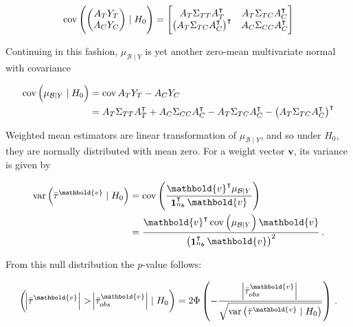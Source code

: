 \documentclass[letter]{article}
\let\Pr\relax
\DeclareMathOperator{\Pr}{\mathbb{P}}
\DeclareMathOperator{\cov}{{cov}}
\DeclareMathOperator{\var}{{var}}
\DeclareMathOperator{\ones}{\mathbf{1}}
\newcommand{\trans}{^{\intercal}}
\newcommand{\vvec}{\mathbold{v}}
\newcommand{\boundary}{\mathcal{B}}
\newcommand{\sentinels}{\bm{b}}
\begin{document}
\begin{equation}
    \cov \del{\begin{pmatrix}A_T Y_T \\ A_C Y_C \end{pmatrix} \mid H_0 } = \begin{bmatrix}
                        A_T \Sigma_{TT} A_T\trans & A_T \Sigma_{TC} A_C\trans \\
                        \del{A_T \Sigma_{TC} A_C \trans}\trans & A_C \Sigma_{CC} A_C\trans
                    \end{bmatrix}
\end{equation}

Continuing in this fashion, \(\mu_{\boundary \mid Y}\) is yet another zero-mean multivariate normal with covariance
    


    	\begin{equation}
\begin{split}
    \cov \del{\mu_{\boundary \mid Y} \mid H_0} &= \cov{ A_T Y_T - A_C Y_C } \\
        &= A_T \Sigma_{TT} A_T\trans + A_C \Sigma_{CC} A_C\trans - A_T \Sigma_{TC} A_C\trans -  \del{A_T\Sigma_{TC} A_C\trans}\trans
\end{split}
\end{equation}
    


    	Weighted mean estimators are linear transformation of \(\mu_{\boundary \mid Y}\), and so under \(H_0\), they are normally distributed with mean zero.
For a weight vector \(\vvec\), its variance is given by

\begin{equation}
\begin{aligned}
    \var\del{\bar{\tau}^\vvec \mid H_0} &= \cov\del{ \frac{\vvec \trans \mu_{\boundary \mid Y}}{\ones_{n_{\sentinels}}\trans \vvec}} \\
    &= \frac{\vvec \trans \cov \del{\mu_{\boundary \mid Y}} \vvec}{\del{\ones_{n_{\sentinels}}\trans \vvec}^2}
    \,.
\end{aligned}
\end{equation}
    


    	From this null distribution the \(p\)-value follows:

\begin{equation}
    \Pr\del{ \abs{\bar{\tau}^\vvec} > \abs{\bar{\tau}_{obs}^\vvec} \mid H_0} = 2 \Phi\del{ -\frac{\abs{\bar{\tau}_{obs}^\vvec}}{\sqrt{\var\del{\bar{\tau}^\vvec \mid H_0}}} }\,.
\end{equation}
\end{document}
